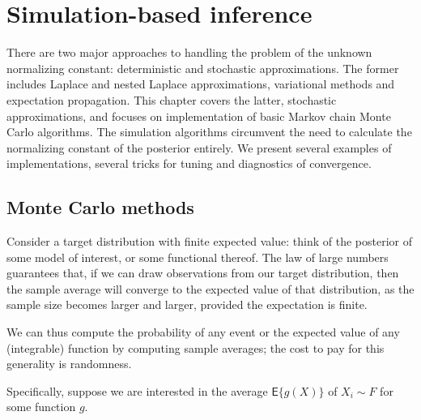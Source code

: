 \documentclass[
  11pt,
  letterpaper,
]{scrbook}
\theoremstyle{definition}
\theoremstyle{definition}
\theoremstyle{definition}
\theoremstyle{plain}
\theoremstyle{remark}
\begin{document}
\hypertarget{simulation-based-inference}{%
\chapter{Simulation-based inference}\label{simulation-based-inference}}

There are two major approaches to handling the problem of the unknown
normalizing constant: deterministic and stochastic approximations. The
former includes Laplace and nested Laplace approximations, variational
methods and expectation propagation. This chapter covers the latter,
stochastic approximations, and focuses on implementation of basic Markov
chain Monte Carlo algorithms. The simulation algorithms circumvent the
need to calculate the normalizing constant of the posterior entirely. We
present several examples of implementations, several tricks for tuning
and diagnostics of convergence.

\hypertarget{monte-carlo-methods}{%
\section{Monte Carlo methods}\label{monte-carlo-methods}}

Consider a target distribution with finite expected value: think of the
posterior of some model of interest, or some functional thereof. The law
of large numbers guarantees that, if we can draw observations from our
target distribution, then the sample average will converge to the
expected value of that distribution, as the sample size becomes larger
and larger, provided the expectation is finite.

We can thus compute the probability of any event or the expected value
of any (integrable) function by computing sample averages; the cost to
pay for this generality is randomness.

Specifically, suppose we are interested in the average
\(\mathsf{E}\{g(X)\}\) of \(X_i \sim F\) for some function \(g\).
\end{document}
